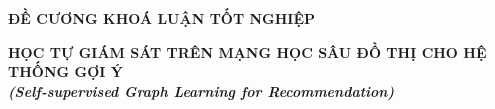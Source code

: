 \documentclass{article}[14pt]
\begin{document}
    \begin{figure}[h]
        \begin{floatrow}
        {%
    
        }
        {%
    
        }
        \end{floatrow}
    \end{figure}
    
    \begin{center}
        
        \textbf{\Large ĐỀ CƯƠNG KHOÁ LUẬN TỐT NGHIỆP} \\ 
    \end{center}
    
    
    \begin{center}
        
        \textbf{\huge HỌC TỰ GIÁM SÁT TRÊN MẠNG HỌC SÂU ĐỒ THỊ CHO HỆ THỐNG GỢI Ý} 
        \\
        
    \vspace{.5cm}
        \textit{\textbf{\Large (Self-supervised Graph Learning for Recommendation)}}
    \end{center}
    
\end{document}
